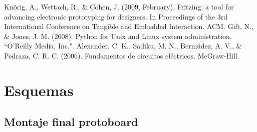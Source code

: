 \documentclass[12]{article}
\newenvironment{Figure}
{\par\medskip\noindent\minipage{\linewidth}}
{\endminipage\par\medskip}
\begin{document}
\begin{multicols}{2}
\begin{thebibliography}{99}
 Knörig, A., Wettach, R., \& Cohen, J. (2009, February). Fritzing: a tool for advancing electronic prototyping for designers. In Proceedings of the 3rd International Conference on Tangible and Embedded Interaction. ACM.
 Gift, N., \& Jones, J. M. (2008). Python for Unix and Linux system administration. ``O'Reilly Media, Inc.".
 Alexander, C. K., Sadiku, M. N., Bermúdez, A. V., \& Pedraza, C. R. C. (2006). Fundamentos de circuitos eléctricos. McGraw-Hill. 
\end{thebibliography}
\end{multicols}
{}
\appendix
\addappheadtotoc
\appendixpage
\section{Esquemas}
\subsection{Montaje final protoboard}
\begin{Figure}	
\center
{}
\label{fig:A}
\end{Figure}
\end{document}
